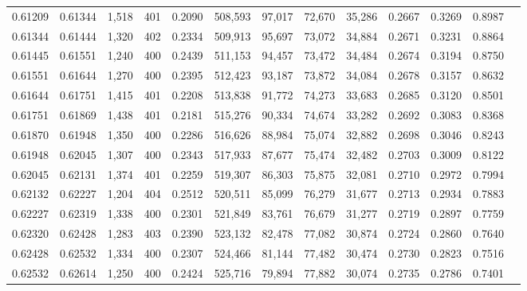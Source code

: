 \begin{tabular}{rrrrrrrrrrrrr}
0.61209 & 0.61344 & 1,518 & 401 &                                     0.2090 & 508,593 &  97,017 &  72,670 &  35,286 & 0.2667 & 0.3269 & 0.8987 \\
0.61344 & 0.61444 & 1,320 & 402 &                                     0.2334 & 509,913 &  95,697 &  73,072 &  34,884 & 0.2671 & 0.3231 & 0.8864 \\
0.61445 & 0.61551 & 1,240 & 400 &                                     0.2439 & 511,153 &  94,457 &  73,472 &  34,484 & 0.2674 & 0.3194 & 0.8750 \\
0.61551 & 0.61644 & 1,270 & 400 &                                     0.2395 & 512,423 &  93,187 &  73,872 &  34,084 & 0.2678 & 0.3157 & 0.8632 \\
0.61644 & 0.61751 & 1,415 & 401 &                                     0.2208 & 513,838 &  91,772 &  74,273 &  33,683 & 0.2685 & 0.3120 & 0.8501 \\
0.61751 & 0.61869 & 1,438 & 401 &                                     0.2181 & 515,276 &  90,334 &  74,674 &  33,282 & 0.2692 & 0.3083 & 0.8368 \\
0.61870 & 0.61948 & 1,350 & 400 &                                     0.2286 & 516,626 &  88,984 &  75,074 &  32,882 & 0.2698 & 0.3046 & 0.8243 \\
0.61948 & 0.62045 & 1,307 & 400 &                                     0.2343 & 517,933 &  87,677 &  75,474 &  32,482 & 0.2703 & 0.3009 & 0.8122 \\
0.62045 & 0.62131 & 1,374 & 401 &                                     0.2259 & 519,307 &  86,303 &  75,875 &  32,081 & 0.2710 & 0.2972 & 0.7994 \\
0.62132 & 0.62227 & 1,204 & 404 &                                     0.2512 & 520,511 &  85,099 &  76,279 &  31,677 & 0.2713 & 0.2934 & 0.7883 \\
0.62227 & 0.62319 & 1,338 & 400 &                                     0.2301 & 521,849 &  83,761 &  76,679 &  31,277 & 0.2719 & 0.2897 & 0.7759 \\
0.62320 & 0.62428 & 1,283 & 403 &                                     0.2390 & 523,132 &  82,478 &  77,082 &  30,874 & 0.2724 & 0.2860 & 0.7640 \\
0.62428 & 0.62532 & 1,334 & 400 &                                     0.2307 & 524,466 &  81,144 &  77,482 &  30,474 & 0.2730 & 0.2823 & 0.7516 \\
0.62532 & 0.62614 & 1,250 & 400 &                                     0.2424 & 525,716 &  79,894 &  77,882 &  30,074 & 0.2735 & 0.2786 & 0.7401 \\

\end{tabular}
